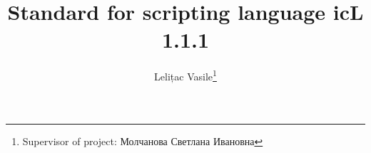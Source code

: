\documentclass[a4paper, 12pt]{extarticle}
\begin{document}



\title{Standard for scripting language icL 1.1.1}
\author{Lelițac Vasile\thanks{Supervisor of project: Молчанова Светлана Ивановна}}

\clearpage\maketitle
\thispagestyle{empty}
\newpage

%

\makeatletter
\renewcommand{\l@section}{\@dottedtocline{1}{1.5em}{2.6em}}
\renewcommand{\l@subsection}{\@dottedtocline{2}{4.0em}{3.6em}}
\renewcommand{\l@subsubsection}{\@dottedtocline{3}{7.4em}{4.5em}}
\makeatother
\tableofcontents

\end{document}
